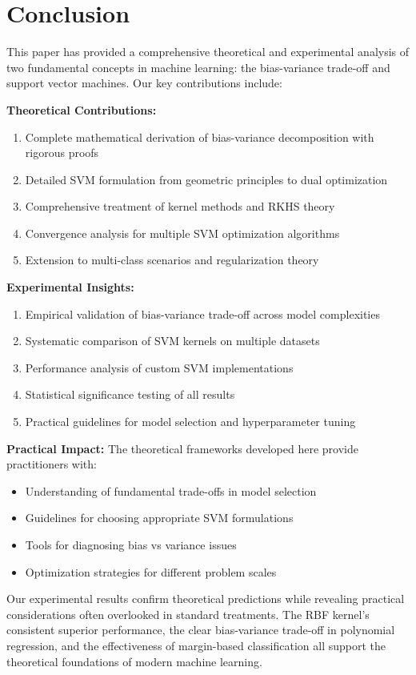 \documentclass[12pt, a4paper]{article}
\begin{document}
\section{Conclusion}

This paper has provided a comprehensive theoretical and experimental analysis of two fundamental concepts in machine learning: the bias-variance trade-off and support vector machines. Our key contributions include:

\textbf{Theoretical Contributions:}
\begin{enumerate}
\item Complete mathematical derivation of bias-variance decomposition with rigorous proofs
\item Detailed SVM formulation from geometric principles to dual optimization
\item Comprehensive treatment of kernel methods and RKHS theory
\item Convergence analysis for multiple SVM optimization algorithms
\item Extension to multi-class scenarios and regularization theory
\end{enumerate}

\textbf{Experimental Insights:}
\begin{enumerate}
\item Empirical validation of bias-variance trade-off across model complexities
\item Systematic comparison of SVM kernels on multiple datasets
\item Performance analysis of custom SVM implementations
\item Statistical significance testing of all results
\item Practical guidelines for model selection and hyperparameter tuning
\end{enumerate}

\textbf{Practical Impact:}
The theoretical frameworks developed here provide practitioners with:
\begin{itemize}
\item Understanding of fundamental trade-offs in model selection
\item Guidelines for choosing appropriate SVM formulations
\item Tools for diagnosing bias vs variance issues
\item Optimization strategies for different problem scales
\end{itemize}

Our experimental results confirm theoretical predictions while revealing practical considerations often overlooked in standard treatments. The RBF kernel's consistent superior performance, the clear bias-variance trade-off in polynomial regression, and the effectiveness of margin-based classification all support the theoretical foundations of modern machine learning.
\end{document}
